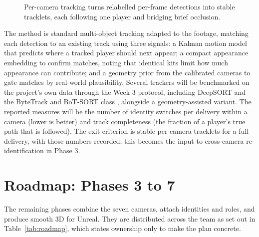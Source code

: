 \documentclass[oneside,openany]{book}
\begin{document}
\begin{figure}[ht]
\begin{center}
\caption{Per-camera tracking turns relabelled per-frame detections into stable tracklets, each
following one player and bridging brief occlusion.}
\label{fig:tracking}
\end{center}
\end{figure}

The method is standard multi-object tracking adapted to the footage, matching each detection to
an existing track using three signals: a Kalman motion model \cite{kalman1960} that predicts
where a tracked player should next appear; a compact appearance embedding to confirm matches,
noting that identical kits limit how much appearance can contribute; and a geometry prior from
the calibrated cameras to gate matches by real-world plausibility. Several trackers will be
benchmarked on the project's own data through the Week 3 protocol, including DeepSORT
\cite{wojke2017deepsort} and the ByteTrack and BoT-SORT class
\cite{zhang2022bytetrack,aharon2022botsort}, alongside a geometry-assisted variant. The reported
measures will be the number of identity switches per delivery within a camera (lower is better)
and track completeness (the fraction of a player's true path that is followed). The exit
criterion is stable per-camera tracklets for a full delivery, with those numbers recorded; this
becomes the input to cross-camera re-identification in Phase 3.

\section{Roadmap: Phases 3 to 7}
The remaining phases combine the seven cameras, attach identities and roles, and produce smooth
3D for Unreal. They are distributed across the team as set out in Table~\ref{tab:roadmap}, which
states ownership only to make the plan concrete.
\end{document}
